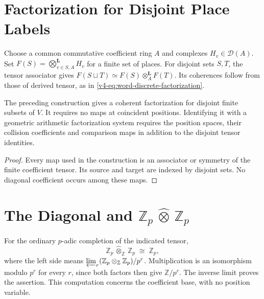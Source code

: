 \section{Factorization for Disjoint Place Labels}
\label{v4-arith:cg:factorization-iso-trivial}

\begin{observation}
\label{v4-arith:obs:factorization-iso-trivial}
Choose a common commutative coefficient ring \(A\) and complexes
\(H_v\in\mathcal D(A)\). Set
\(F(S)=\bigotimes_{v\in S,A}^{\mathbf L}H_v\) for a finite set
of places. For disjoint sets \(S,T\), the tensor associator gives
\(F(S\sqcup T)\simeq F(S)\otimes_A^{\mathbf L}F(T)\).
Its coherences follow from those of derived tensor, as in
\eqref{v4-eq:word-discrete-factorization}.
\end{observation}

\begin{corollary}
\label{v4-arith:cor:no-nontrivial-factorization}
The preceding construction gives a coherent factorization for
disjoint finite subsets of \(V\). It requires no maps at coincident
positions. Identifying it with a geometric arithmetic factorization
system requires the position spaces, their collision coefficients
and comparison maps in addition to the disjoint tensor identities.
\end{corollary}
\begin{proof}
Every map used in the construction is an associator or symmetry of
the finite coefficient tensor. Its source and target are indexed
by disjoint sets. No diagonal coefficient occurs among these maps.
\end{proof}

\section{The Diagonal and \(\mathbb{Z}_{p}\,\widehat{\otimes}\,\mathbb{Z}_{p}\)}
\label{v4-arith:cg:diagonal-Zp-tensor}

\begin{observation}
\label{v4-arith:obs:Zp-tensor-collapses}
For the ordinary \(p\)-adic completion of the indicated tensor,
\begin{equation}
\mathbb{Z}_{p}\,\widehat{\otimes}_{\mathbb{Z}}\,\mathbb{Z}_{p}\;\cong\;\mathbb{Z}_{p},
\end{equation}
where the left side means
\(\varprojlim_r(\mathbb Z_p\otimes_{\mathbb Z}\mathbb Z_p)/p^r\).
Multiplication is an isomorphism modulo \(p^r\) for every \(r\),
since both factors then give \(\mathbb Z/p^r\). The inverse limit
proves the assertion. This computation concerns the coefficient
base, with no position variable.
\end{observation}

